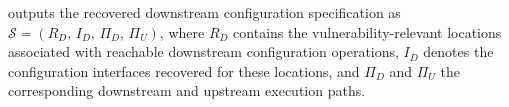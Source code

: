 \sys outputs the recovered downstream configuration specification as $\mathcal{S}=(R_D,\,I_D,\,\Pi_D,\,\Pi_U)$, where $R_D$ contains the vulnerability-relevant locations associated with reachable downstream configuration operations, $I_D$ denotes the configuration interfaces recovered for these locations, and $\Pi_D$ and $\Pi_U$ the corresponding downstream and upstream execution paths.








